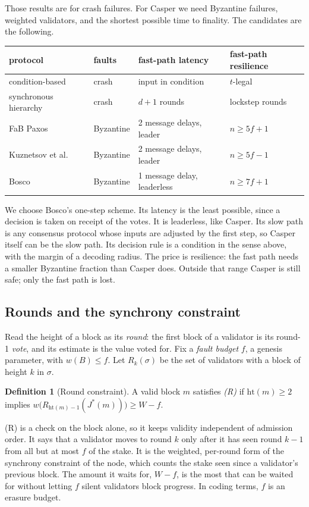 \documentclass[11pt]{article}
\theoremstyle{definition}
\newtheorem{definition}[theorem]{Definition}
\theoremstyle{remark}
\newcommand{\Jst}{J^{*}}
\newcommand{\hgt}{\mathrm{ht}}
\begin{document}
Those results are for crash failures. For Casper we need Byzantine failures,
weighted validators, and the shortest possible time to finality. The candidates
are the following.
\begin{center}
\small
\begin{tabular}{@{}llll@{}}
\toprule
protocol & faults & fast-path latency & fast-path resilience\\
\midrule
condition-based~\cite{mrr-jacm} & crash & input in condition & $t$-legal\\
synchronous hierarchy~\cite{mrr-sync} & crash & $d+1$ rounds & lockstep rounds\\
FaB Paxos~\cite{fab} & Byzantine & 2 message delays, leader & $n\ge5f+1$\\
Kuznetsov et al.~\cite{ktz} & Byzantine & 2 message delays, leader & $n\ge5f-1$\\
Bosco~\cite{bosco} & Byzantine & 1 message delay, leaderless & $n\ge7f+1$\\
\bottomrule
\end{tabular}
\end{center}
We choose Bosco's one-step scheme. Its latency is the least possible, since a
decision is taken on receipt of the votes. It is leaderless, like Casper. Its
slow path is any consensus protocol whose inputs are adjusted by the first
step, so Casper itself can be the slow path. Its decision rule is a condition in
the sense above, with the margin of a decoding radius. The price is resilience:
the fast path needs a smaller Byzantine fraction than Casper does. Outside that
range Casper is still safe; only the fast path is lost.

\subsection{Rounds and the synchrony constraint}

Read the height of a block as its \emph{round}: the first block of a validator
is its round-1 \emph{vote}, and its estimate is the value voted for. Fix a
\emph{fault budget} $f$, a genesis parameter, with $w(B)\le f$. Let
$R_k(\sigma)$ be the set of validators with a block of height $k$ in $\sigma$.

\begin{definition}[Round constraint]\label{def:round}
A valid block $m$ satisfies \emph{(R)} if $\hgt(m)\ge2$ implies
$w\bigl(R_{\hgt(m)-1}(\Jst(m))\bigr)\ge W-f$.
\end{definition}

(R) is a check on the block alone, so it keeps validity independent of
admission order. It says that a validator moves to round $k$ only after it has
seen round $k-1$ from all but at most $f$ of the stake. It is the weighted,
per-round form of the synchrony constraint of the node, which counts the stake
seen since a validator's previous block. The amount it waits for,
$W-f$, is the most that can be waited for without letting $f$ silent
validators block progress. In coding terms, $f$ is an erasure budget.
\end{document}
